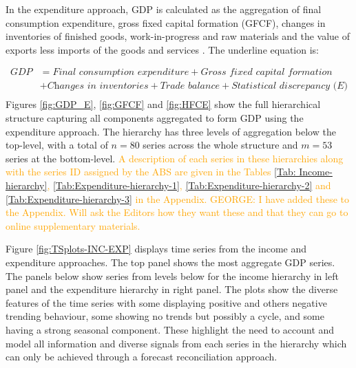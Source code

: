 \documentclass[graybox]{svmult}
\begin{document}
In the expenditure approach, GDP is calculated as the aggregation of final consumption expenditure, gross fixed capital formation (GFCF), changes in inventories of finished goods, work-in-progress and raw materials and the value of exports less imports of the goods and services \citep{ABS2015}. The underline equation is:

\begin{align*}
	\textit{GDP} &= \textit{Final consumption expenditure} + \textit{Gross fixed capital formation} \\ & + \textit{Changes in inventories} + \textit{Trade balance}+\textit{Statistical discrepancy (E)}\\
	\end{align*}
Figures \ref{fig:GDP_E}, \ref{fig:GFCF} and \ref{fig:HFCE} show the full hierarchical structure capturing all components aggregated to form GDP using the expenditure approach. The hierarchy has three levels of aggregation below the top-level, with a total of $n=80$ series across the whole structure and $m=53$ series at the bottom-level. \textcolor{orange}{A description of each series in these hierarchies along with the series ID assigned by the ABS are given in the Tables \ref{Tab: Income-hierarchy}, \ref{Tab:Expenditure-hierarchy-1}, \ref{Tab:Expenditure-hierarchy-2} and \ref{Tab:Expenditure-hierarchy-3} in the Appendix. GEORGE: I have added these to the Appendix. Will ask the Editors how they want these and that they can go to online supplementary materials.}


Figure \ref{fig:TSplots-INC-EXP} displays time series from the income and expenditure approaches. The top panel shows the most aggregate GDP series. The panels below show series from levels below for the income hierarchy in left panel and the expenditure hierarchy in right panel. The plots show the diverse features of the time series with some displaying positive and others negative trending behaviour, some showing no trends but possibly a cycle, and some having a strong seasonal component. These highlight the need to account and model all information and diverse signals from each series in the hierarchy which can only be achieved through a forecast reconciliation approach.
\end{document}
